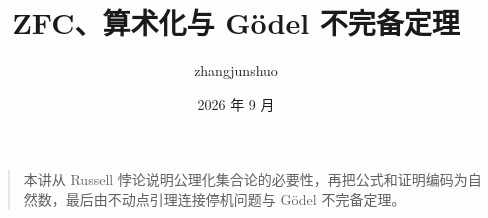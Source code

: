 \documentclass[UTF8,a4paper,11pt]{ctexart}
\title{ZFC、算术化与 Gödel 不完备定理}
\author{zhangjunshuo}\date{2026 年 9 月}
\begin{document}
\maketitle
\begin{quote}
本讲从 Russell 悖论说明公理化集合论的必要性，再把公式和证明编码为自然数，最后由不动点引理连接停机问题与 Gödel 不完备定理。
\end{quote}
\tableofcontents\clearpage
\clearpage
\clearpage
\clearpage

\end{document}
